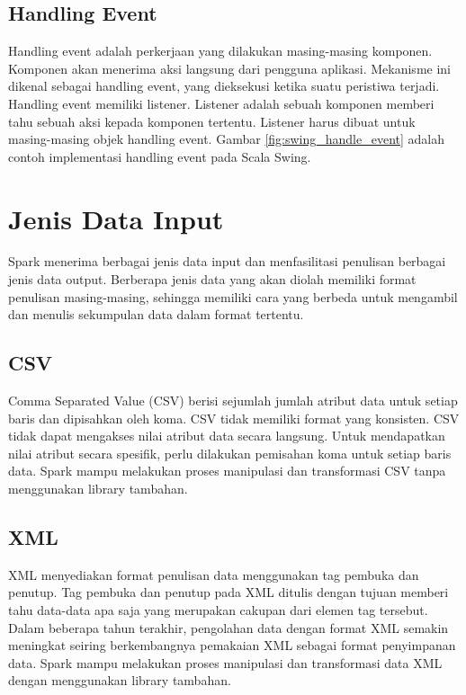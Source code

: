\subsection{Handling Event}
Handling event adalah perkerjaan yang dilakukan masing-masing komponen. Komponen akan menerima aksi langsung dari pengguna aplikasi. Mekanisme ini dikenal sebagai handling event, yang dieksekusi ketika suatu peristiwa terjadi. Handling event memiliki listener. Listener adalah sebuah komponen memberi tahu sebuah aksi kepada komponen tertentu. Listener harus dibuat untuk masing-masing objek handling event. Gambar \ref{fig:swing_handle_event} adalah contoh implementasi handling event pada Scala Swing.

\section{Jenis Data Input}
Spark menerima berbagai jenis data input dan menfasilitasi penulisan berbagai jenis data output. Berberapa jenis data yang akan diolah memiliki format penulisan masing-masing, sehingga memiliki cara yang berbeda untuk mengambil dan menulis sekumpulan data dalam format tertentu. 

\subsection{CSV}
Comma Separated Value (CSV) berisi sejumlah jumlah atribut data untuk setiap baris dan dipisahkan oleh koma. CSV tidak memiliki format yang konsisten. CSV tidak dapat mengakses nilai atribut data secara langsung. Untuk mendapatkan nilai atribut secara spesifik, perlu dilakukan pemisahan koma untuk setiap baris data. Spark mampu melakukan proses manipulasi dan transformasi CSV tanpa menggunakan library tambahan.

\subsection{XML}
XML menyediakan format penulisan data menggunakan tag pembuka dan penutup. Tag pembuka dan penutup pada XML ditulis dengan tujuan memberi tahu data-data apa saja yang merupakan cakupan dari elemen tag tersebut. Dalam beberapa tahun terakhir, pengolahan data dengan format XML semakin meningkat seiring berkembangnya pemakaian XML sebagai format penyimpanan data. Spark mampu melakukan proses manipulasi dan transformasi data XML dengan menggunakan library tambahan.
